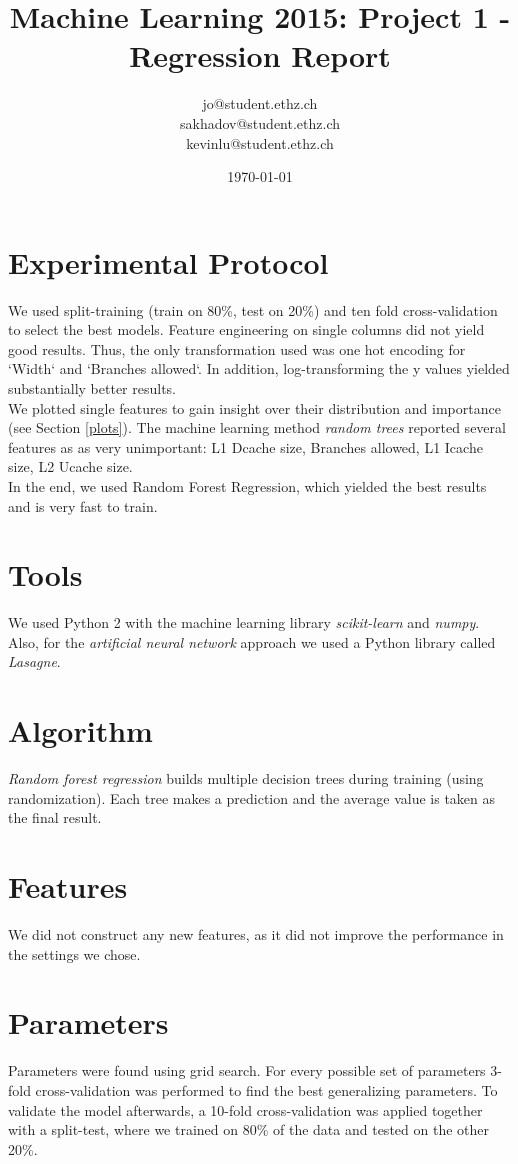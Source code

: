 \documentclass[a4paper, 11pt]{article}
\title{Machine Learning 2015: Project 1 - Regression Report}
\author{jo@student.ethz.ch\\ sakhadov@student.ethz.ch\\ kevinlu@student.ethz.ch\\}
\date{\today}
\begin{document}
\maketitle

\section*{Experimental Protocol}
We used split-training (train on 80\%, test on 20\%) and ten fold cross-validation to select the best models.
Feature engineering on single columns did not yield good results.
Thus, the only transformation used was one hot encoding for `Width` and `Branches allowed`. In addition, log-transforming the y values yielded substantially better results.\\
We plotted single features to gain insight over their distribution and importance (see Section \ref{plots}).
The machine learning method \textit{random trees} reported several features as as very unimportant: L1 Dcache size, Branches allowed, L1 Icache size, L2 Ucache size.\\
In the end, we used Random Forest Regression, which yielded the best results and is very fast to train.

\section{Tools}
We used Python 2 with the machine learning library \textit{scikit-learn} and \textit{numpy}. Also, for the \textit{artificial neural network} approach we used a Python library called \textit{Lasagne}.

\section{Algorithm}
\textit{Random forest regression} builds multiple decision trees during training (using randomization). Each tree makes a prediction and the average value is taken as the final result.

\section{Features}
We did not construct any new features, as it did not improve the performance in the settings we chose.

\section{Parameters}
Parameters were found using grid search. For every possible set of parameters 3-fold cross-validation was performed to find the best generalizing parameters. To validate the model afterwards, a 10-fold cross-validation was applied together with a split-test, where we trained on 80\% of the data and tested on the other 20\%.
\end{document}
